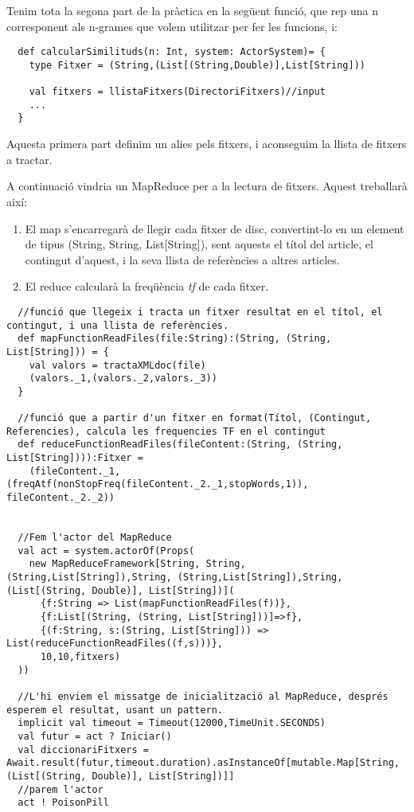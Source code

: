 \documentclass[11pt,a4paper,twoside]{report}
\begin{document}
Tenim tota la segona part de la pràctica en la següent funció, que rep una n corresponent als n-grames que volem utilitzar per fer les funcions, i:

\begin{lstlisting}
  def calcularSimilituds(n: Int, system: ActorSystem)= {
    type Fitxer = (String,(List[(String,Double)],List[String]))

    val fitxers = llistaFitxers(DirectoriFitxers)//input
    ...
  }
\end{lstlisting}

Aquesta primera part definim un alies pels fitxers, i aconseguim la llista de fitxers a tractar.

A continuació vindria un MapReduce per a la lectura de fitxers. Aquest treballarà així:
\begin{enumerate}
  \item El map s'encarregarà de llegir cada fitxer de disc, convertint-lo en un element de tipus (String, String, List[String]), sent aquests el títol del article, el contingut d'aquest, i la seva llista de referències a altres articles.
  \item El reduce calcularà la freqüència \textit{tf} de cada fitxer.
\end{enumerate}

\begin{lstlisting}
  //funció que llegeix i tracta un fitxer resultat en el títol, el contingut, i una llista de referències.
  def mapFunctionReadFiles(file:String):(String, (String, List[String])) = {
    val valors = tractaXMLdoc(file)
    (valors._1,(valors._2,valors._3))
  }

  //funció que a partir d'un fitxer en format(Títol, (Contingut, Referencies), calcula les frequencies TF en el contingut
  def reduceFunctionReadFiles(fileContent:(String, (String, List[String]))):Fitxer =
    (fileContent._1, (freqAtf(nonStopFreq(fileContent._2._1,stopWords,1)), fileContent._2._2))


  //Fem l'actor del MapReduce
  val act = system.actorOf(Props(
    new MapReduceFramework[String, String, (String,List[String]),String, (String,List[String]),String, (List[(String, Double)], List[String])](
      {f:String => List(mapFunctionReadFiles(f))},
      {f:List[(String, (String, List[String]))]=>f},
      {(f:String, s:(String, List[String])) => List(reduceFunctionReadFiles((f,s)))},
      10,10,fitxers)
  ))

  //L'hi enviem el missatge de inicialització al MapReduce, després esperem el resultat, usant un pattern.
  implicit val timeout = Timeout(12000,TimeUnit.SECONDS)
  val futur = act ? Iniciar()
  val diccionariFitxers = Await.result(futur,timeout.duration).asInstanceOf[mutable.Map[String, (List[(String, Double)], List[String])]]
  //parem l'actor
  act ! PoisonPill
\end{lstlisting}
\end{document}
